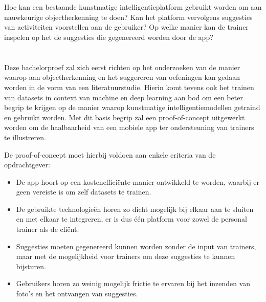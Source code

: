 \section{}
\label{sec:onderzoeksvraag}
Hoe kan een bestaande kunstmatige intelligentieplatform gebruikt worden om aan nauwkeurige objectherkenning te doen?
Kan het platform vervolgens suggesties van activiteiten voorstellen aan de gebruiker?
Op welke manier kan de trainer inspelen op het de suggesties die gegenereerd worden door de app?

\section{}
\label{sec:onderzoeksdoelstelling}
Deze bachelorproef zal zich eerst richten op het onderzoeken van de manier waarop aan objectherkenning en het suggereren van oefeningen kan gedaan worden in de vorm van een literatuurstudie.
Hierin komt tevens ook het trainen van datasets in context van machine en deep learning aan bod om een beter begrip te krijgen op de manier waarop kunstmatige intelligentiemodellen getraind en gebruikt worden.
Met dit basis begrip zal een proof-of-concept uitgewerkt worden om de haalbaarheid van een mobiele app ter ondersteuning van trainers te illustreren.

De proof-of-concept moet hierbij voldoen aan enkele criteria van de opdrachtgever:
\begin{itemize}
    \item De app hoort op een kostenefficiënte manier ontwikkeld te worden, waarbij er geen vereiste is om zelf datasets te trainen.
    \item De gebruikte technologieën horen zo dicht mogelijk bij elkaar aan te sluiten en met elkaar te integreren, er is dus één platform voor zowel de personal trainer als de cliënt.
    \item Suggesties moeten gegenereerd kunnen worden zonder de input van trainers, maar met de mogelijkheid voor trainers om deze suggesties te kunnen bijsturen.
    \item Gebruikers horen zo weinig mogelijk frictie te ervaren bij het inzenden van foto's en het ontvangen van suggesties.
\end{itemize}


